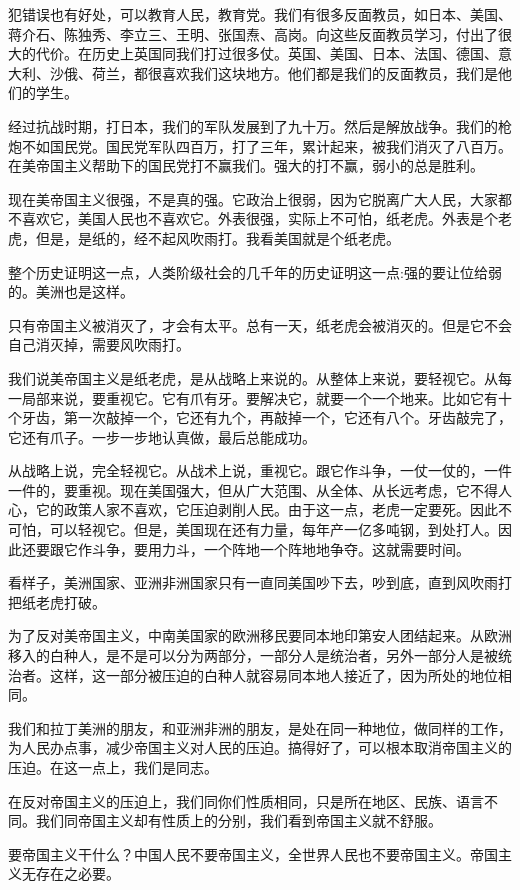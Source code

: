 犯错误也有好处，可以教育人民，教育党。我们有很多反面教员，如日本、美国、蒋介石、陈独秀、李立三、王明、张国焘、高岗。向这些反面教员学习，付出了很大的代价。在历史上英国同我们打过很多仗。英国、美国、日本、法国、德国、意大利、沙俄、荷兰，都很喜欢我们这块地方。他们都是我们的反面教员，我们是他们的学生。

经过抗战时期，打日本，我们的军队发展到了九十万。然后是解放战争。我们的枪炮不如国民党。国民党军队四百万，打了三年，累计起来，被我们消灭了八百万。在美帝国主义帮助下的国民党打不赢我们。强大的打不赢，弱小的总是胜利。

现在美帝国主义很强，不是真的强。它政治上很弱，因为它脱离广大人民，大家都不喜欢它，美国人民也不喜欢它。外表很强，实际上不可怕，纸老虎。外表是个老虎，但是，是纸的，经不起风吹雨打。我看美国就是个纸老虎。

整个历史证明这一点，人类阶级社会的几千年的历史证明这一点:强的要让位给弱的。美洲也是这样。

只有帝国主义被消灭了，才会有太平。总有一天，纸老虎会被消灭的。但是它不会自己消灭掉，需要风吹雨打。

我们说美帝国主义是纸老虎，是从战略上来说的。从整体上来说，要轻视它。从每一局部来说，要重视它。它有爪有牙。要解决它，就要一个一个地来。比如它有十个牙齿，第一次敲掉一个，它还有九个，再敲掉一个，它还有八个。牙齿敲完了，它还有爪子。一步一步地认真做，最后总能成功。

从战略上说，完全轻视它。从战术上说，重视它。跟它作斗争，一仗一仗的，一件一件的，要重视。现在美国强大，但从广大范围、从全体、从长远考虑，它不得人心，它的政策人家不喜欢，它压迫剥削人民。由于这一点，老虎一定要死。因此不可怕，可以轻视它。但是，美国现在还有力量，每年产一亿多吨钢，到处打人。因此还要跟它作斗争，要用力斗，一个阵地一个阵地地争夺。这就需要时间。

看样子，美洲国家、亚洲非洲国家只有一直同美国吵下去，吵到底，直到风吹雨打把纸老虎打破。

为了反对美帝国主义，中南美国家的欧洲移民要同本地印第安人团结起来。从欧洲移入的白种人，是不是可以分为两部分，一部分人是统治者，另外一部分人是被统治者。这样，这一部分被压迫的白种人就容易同本地人接近了，因为所处的地位相同。

我们和拉丁美洲的朋友，和亚洲非洲的朋友，是处在同一种地位，做同样的工作，为人民办点事，减少帝国主义对人民的压迫。搞得好了，可以根本取消帝国主义的压迫。在这一点上，我们是同志。

在反对帝国主义的压迫上，我们同你们性质相同，只是所在地区、民族、语言不同。我们同帝国主义却有性质上的分别，我们看到帝国主义就不舒服。

要帝国主义干什么？中国人民不要帝国主义，全世界人民也不要帝国主义。帝国主义无存在之必要。
